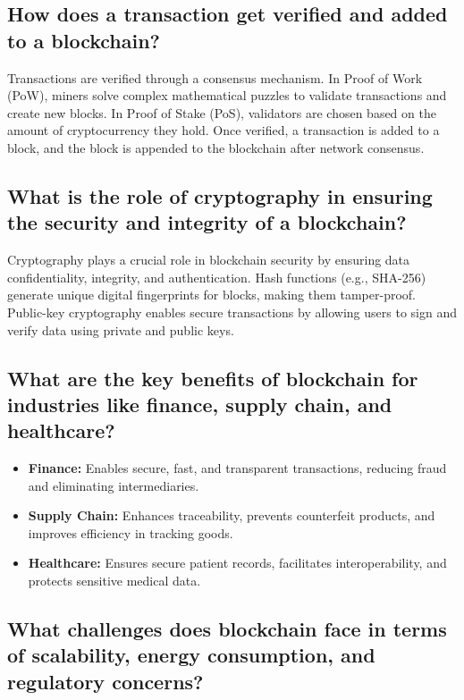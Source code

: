 \documentclass[11pt]{article}
\begin{document}
\subsection{How does a transaction get verified and added to a blockchain?}

Transactions are verified through a consensus mechanism. In Proof of Work (PoW), miners solve complex mathematical puzzles to validate transactions and create new blocks. In Proof of Stake (PoS), validators are chosen based on the amount of cryptocurrency they hold. Once verified, a transaction is added to a block, and the block is appended to the blockchain after network consensus.

\subsection{What is the role of cryptography in ensuring the security and integrity of a blockchain?}

Cryptography plays a crucial role in blockchain security by ensuring data confidentiality, integrity, and authentication. Hash functions (e.g., SHA-256) generate unique digital fingerprints for blocks, making them tamper-proof. Public-key cryptography enables secure transactions by allowing users to sign and verify data using private and public keys.

\subsection{What are the key benefits of blockchain for industries like finance, supply chain, and healthcare?}

\begin{itemize}
    \item \textbf{Finance:} Enables secure, fast, and transparent transactions, reducing fraud and eliminating intermediaries.
    \item \textbf{Supply Chain:} Enhances traceability, prevents counterfeit products, and improves efficiency in tracking goods.
    \item \textbf{Healthcare:} Ensures secure patient records, facilitates interoperability, and protects sensitive medical data.
\end{itemize}

\subsection{What challenges does blockchain face in terms of scalability, energy consumption, and regulatory concerns?}
\end{document}
